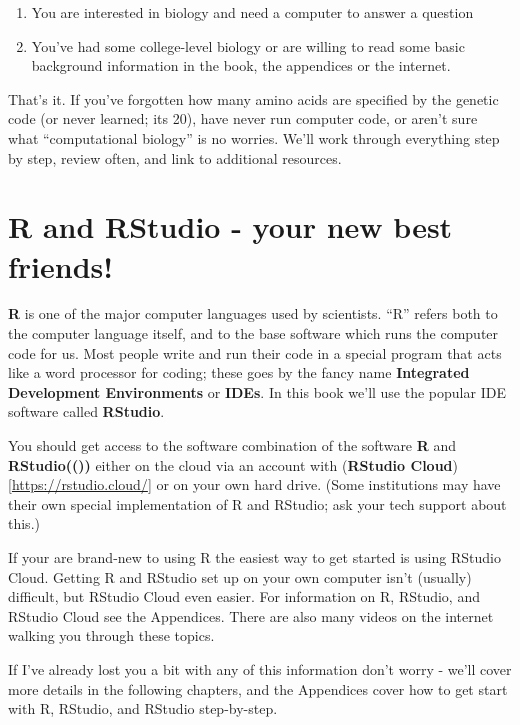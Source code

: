 \documentclass[
]{book}
\providecommand{\tightlist}{%
  \setlength{\itemsep}{0pt}\setlength{\parskip}{0pt}}
\begin{document}
\begin{enumerate}
\def\labelenumi{\arabic{enumi}.}
\tightlist
\item
  You are interested in biology and need a computer to answer a question
\item
  You've had some college-level biology or are willing to read some basic background information in the book, the appendices or the internet.
\end{enumerate}

That's it. If you've forgotten how many amino acids are specified by the genetic code (or never learned; its 20), have never run computer code, or aren't sure what ``computational biology'' is no worries. We'll work through everything step by step, review often, and link to additional resources.

\hypertarget{r-and-rstudio---your-new-best-friends}{%
\section{R and RStudio - your new best friends!}\label{r-and-rstudio---your-new-best-friends}}

\textbf{R} is one of the major computer languages used by scientists. ``R'' refers both to the computer language itself, and to the base software which runs the computer code for us. Most people write and run their code in a special program that acts like a word processor for coding; these goes by the fancy name \textbf{Integrated Development Environments} or \textbf{IDEs}. In this book we'll use the popular IDE software called \textbf{RStudio}.

You should get access to the software combination of the software \textbf{R} and \textbf{RStudio(())} either on the cloud via an account with (\textbf{RStudio Cloud}){[}\url{https://rstudio.cloud/}{]} or on your own hard drive. (Some institutions may have their own special implementation of R and RStudio; ask your tech support about this.)

If your are brand-new to using R the easiest way to get started is using RStudio Cloud. Getting R and RStudio set up on your own computer isn't (usually) difficult, but RStudio Cloud even easier. For information on R, RStudio, and RStudio Cloud see the Appendices. There are also many videos on the internet walking you through these topics.

If I've already lost you a bit with any of this information don't worry - we'll cover more details in the following chapters, and the Appendices cover how to get start with R, RStudio, and RStudio step-by-step.
\end{document}
